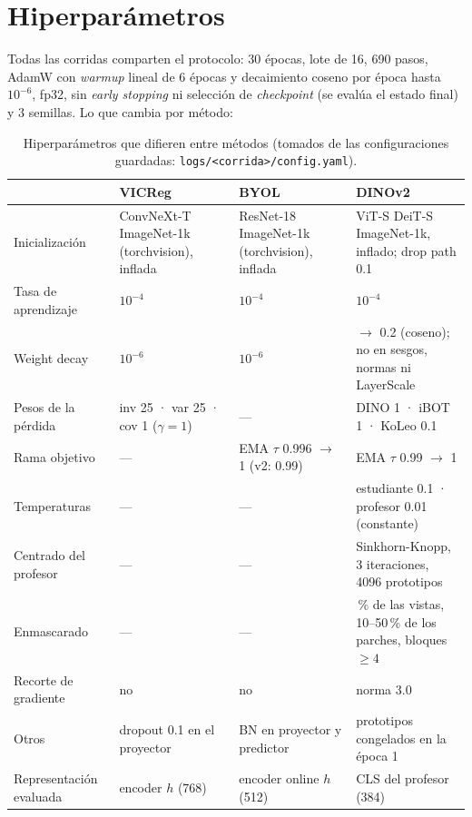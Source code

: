 \documentclass[11pt,a4paper]{article}
\begin{document}
\section{Hiperparámetros}
\label{sec:hparams}

Todas las corridas comparten el protocolo: 30 épocas, lote de 16, 690 pasos, AdamW con
\emph{warmup} lineal de 6 épocas y decaimiento coseno por época hasta $10^{-6}$, fp32, sin
\emph{early stopping} ni selección de \emph{checkpoint} (se evalúa el estado final) y 3
semillas. Lo que cambia por método:

\begin{table}[H]
\centering
\small
\begin{tabularx}{\textwidth}{>{\raggedright\arraybackslash}p{3.0cm}>{\raggedright\arraybackslash}X>{\raggedright\arraybackslash}X>{\raggedright\arraybackslash}X}
\toprule
 & \textcolor{vicregc}{\textbf{VICReg}} & \textcolor{byolc}{\textbf{BYOL}} & \textcolor{dinoc}{\textbf{DINOv2}} \\
\midrule
Inicialización & ConvNeXt-T ImageNet-1k (torchvision), inflada & ResNet-18 ImageNet-1k (torchvision), inflada & ViT-S DeiT-S ImageNet-1k, inflado; drop path 0.1 \\
Tasa de aprendizaje & $10^{-4}$ & $10^{-4}$ & $10^{-4}$ \\
Weight decay & $10^{-6}$ & $10^{-6}$ & 0.04 $\rightarrow$ 0.2 (coseno); no en sesgos, normas ni LayerScale \\
Pesos de la pérdida & inv 25 · var 25 · cov 1 ($\gamma=1$) & --- & DINO 1 · iBOT 1 · KoLeo 0.1 \\
Rama objetivo & --- & EMA $\tau$ 0.996 $\rightarrow$ 1 (v2: 0.99) & EMA $\tau$ 0.99 $\rightarrow$ 1 \\
Temperaturas & --- & --- & estudiante 0.1 · profesor 0.01 (constante) \\
Centrado del profesor & --- & --- & Sinkhorn-Knopp, 3 iteraciones, 4096 prototipos \\
Enmascarado & --- & --- & 50\,\% de las vistas, 10--50\,\% de los parches, bloques $\geq4$ \\
Recorte de gradiente & no & no & norma 3.0 \\
Otros & dropout 0.1 en el proyector & BN en proyector y predictor & prototipos congelados en la época 1 \\
Representación evaluada & encoder $h$ (768) & encoder online $h$ (512) & CLS del profesor (384) \\
\bottomrule
\end{tabularx}
\caption{Hiperparámetros que difieren entre métodos (tomados de las configuraciones
guardadas: \texttt{logs/<corrida>/config.yaml}).}
\label{tab:hparams}
\end{table}
\end{document}
